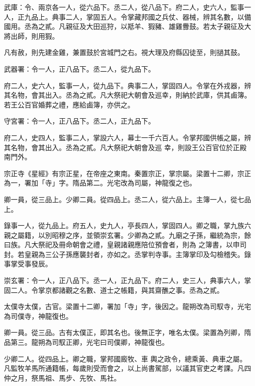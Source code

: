 \begin{pinyinscope}
 武庫：令、兩京各一人，從六品下。丞二人，從八品下。府二人，史六人，監事一人，正九品上。典事二人，掌固五人。令掌藏邦國之兵仗、器械，辨其名數，以備國用。丞為之貳。凡親征及大田巡狩，以羝羊、猳豬、雄雞釁鼓。若太子親征及大將出師，則用猳。



 凡有赦，則先建金雞，兼置鼓於宮城門之右。視大理及府縣囚徒至，則撾其鼓。



 武器署：令一人，正八品下。丞二人，從九品下。



 府二人，史六人，監事一人，從九品下。典事二人，掌固四人。令掌在外戎器，辨其名物，會其出入。丞為之貳。凡大祭祀大朝會及巡幸，則納於武庫，供其鹵簿。若王公百官婚葬之禮，應給鹵簿，亦供之。



 守宮署：令一人，正八品下。丞二人，正九品下。



 府二人，史四人，監事二人，掌設六人，幕士一千六百人。令掌邦國供帳之屬，辨其名物，會其出入。丞為之貳。凡大祭祀大朝會及巡
 幸，則設王公百官位於正殿南門外。



 宗正寺《星經》有宗正星，在帝座之東南。秦置宗正，掌宗屬。梁置十二卿，宗正為一，署加「寺」字。隋品第二。光宅改為司屬，神龍復之也。



 卿一員，從三品上。少卿二員。從四品上。丞二人，從六品上。主簿一人，從七品上。



 錄事一人，從九品上。府五人，史九人，亭長四人，掌固四人。卿之職，掌九族六親之屬籍，以別昭穆之序，並領崇玄署。少卿為之貳。九廟之子孫，繼統為宗，餘曰族。凡大祭祀及冊命朝會之禮，皇親諸親應陪位預會者，則為
 之簿書，以申司封。若皇親為三公子孫應襲封者，亦如之。丞掌判寺事。主簿掌印及勾檢稽失。錄事掌受事發辰。



 崇玄署：令一人，正八品下。丞一人，正九品下。府二人，史三人，典事六人，掌固二人。令掌京都諸觀之名數、道士之帳籍，與其齋醮之事。丞為之貳。



 太僕寺太僕，古官。梁置十二卿，署加「寺」字，後因之。龍朔改為司馭寺，光宅為司僕寺，神龍復也。



 卿一員。從三品。古有太僕正，即其名也。後無正字，唯名太僕。梁置為列卿，隋品第三。龍朔為司馭正卿，光宅曰司僕卿，神龍復也。



 少卿二人。從四品上。卿之職，掌邦國廄牧、車
 輿之政令，總乘黃、典車之屬。凡監牧羊馬所通籍帳，每歲則受而會之，以上尚書駕部，以議其官吏之考課。凡四仲之月，祭馬祖、馬步、先牧、馬社。




\end{pinyinscope}
